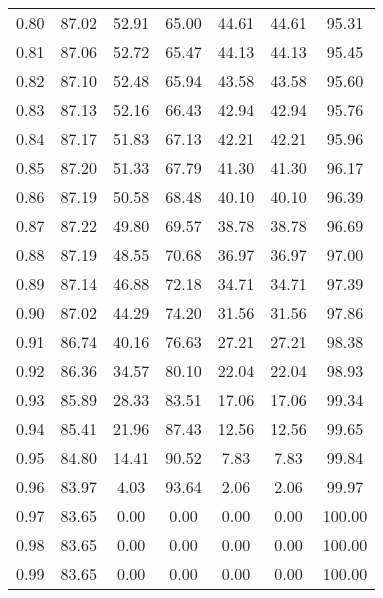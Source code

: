 \begin{tabular}{|c|c|c|c|c|c|c|}
      0.80 &     87.02 &     52.91 &      65.00 &   44.61 &      44.61 &         95.31 \\
      0.81 &     87.06 &     52.72 &      65.47 &   44.13 &      44.13 &         95.45 \\
      0.82 &     87.10 &     52.48 &      65.94 &   43.58 &      43.58 &         95.60 \\
      0.83 &     87.13 &     52.16 &      66.43 &   42.94 &      42.94 &         95.76 \\
      0.84 &     87.17 &     51.83 &      67.13 &   42.21 &      42.21 &         95.96 \\
      0.85 &     87.20 &     51.33 &      67.79 &   41.30 &      41.30 &         96.17 \\
      0.86 &     87.19 &     50.58 &      68.48 &   40.10 &      40.10 &         96.39 \\
      0.87 &     87.22 &     49.80 &      69.57 &   38.78 &      38.78 &         96.69 \\
      0.88 &     87.19 &     48.55 &      70.68 &   36.97 &      36.97 &         97.00 \\
      0.89 &     87.14 &     46.88 &      72.18 &   34.71 &      34.71 &         97.39 \\
      0.90 &     87.02 &     44.29 &      74.20 &   31.56 &      31.56 &         97.86 \\
      0.91 &     86.74 &     40.16 &      76.63 &   27.21 &      27.21 &         98.38 \\
      0.92 &     86.36 &     34.57 &      80.10 &   22.04 &      22.04 &         98.93 \\
      0.93 &     85.89 &     28.33 &      83.51 &   17.06 &      17.06 &         99.34 \\
      0.94 &     85.41 &     21.96 &      87.43 &   12.56 &      12.56 &         99.65 \\
      0.95 &     84.80 &     14.41 &      90.52 &    7.83 &       7.83 &         99.84 \\
      0.96 &     83.97 &      4.03 &      93.64 &    2.06 &       2.06 &         99.97 \\
      0.97 &     83.65 &      0.00 &       0.00 &    0.00 &       0.00 &        100.00 \\
      0.98 &     83.65 &      0.00 &       0.00 &    0.00 &       0.00 &        100.00 \\
      0.99 &     83.65 &      0.00 &       0.00 &    0.00 &       0.00 &        100.00 \\
\bottomrule
\end{tabular}
